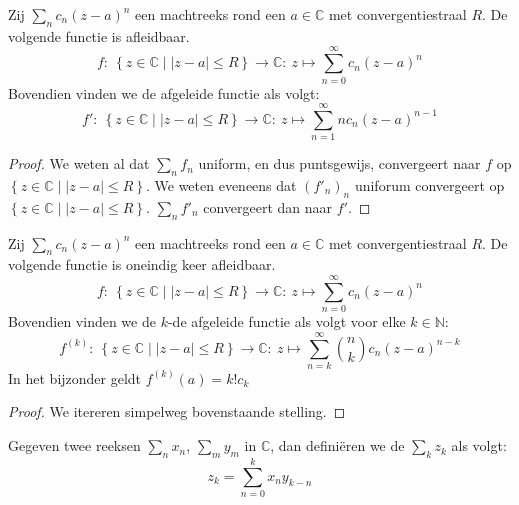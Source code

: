 \documentclass[main.tex]{subfiles}
\begin{document}
\begin{bst}
  Zij $\sum_{n}c_{n}(z-a)^{n}$ een machtreeks rond een $a\in \mathbb{C}$ met convergentiestraal $R$.
  De volgende functie is afleidbaar.
  \[ f:\ \left\{ z \in \mathbb{C} \mid |z-a| \le R \right\} \rightarrow \mathbb{C}:\ z \mapsto \sum_{n=0}^{\infty}c_{n}(z-a)^{n}  \]
  Bovendien vinden we de afgeleide functie als volgt:
  \[ f':\ \left\{ z \in \mathbb{C} \mid |z-a| \le R \right\} \rightarrow \mathbb{C}:\ z \mapsto \sum_{n=1}^{\infty}nc_{n}(z-a)^{n-1}  \]

  \begin{proof}
    We weten al dat $\sum_{n}f_{n}$ uniform, en dus puntsgewijs\needed, convergeert naar $f$ op $\left\{ z \in \mathbb{C} \mid |z-a| \le R \right\}$.
    We weten eveneens dat $(f'_{n})_{n}$ uniforum convergeert op $\left\{ z \in \mathbb{C} \mid |z-a| \le R \right\}$.
    $\sum_{n}f'_{n}$ convergeert dan naar $f'$.
  \end{proof}
\end{bst}

\begin{bgev}
  Zij $\sum_{n}c_{n}(z-a)^{n}$ een machtreeks rond een $a\in \mathbb{C}$ met convergentiestraal $R$.
  De volgende functie is oneindig keer afleidbaar.
  \[ f:\ \left\{ z \in \mathbb{C} \mid |z-a| \le R \right\} \rightarrow \mathbb{C}:\ z \mapsto \sum_{n=0}^{\infty}c_{n}(z-a)^{n}  \]
  Bovendien vinden we de $k$-de afgeleide functie als volgt voor elke $k\in \mathbb{N}$:
  \[ f^{(k)}:\ \left\{ z \in \mathbb{C} \mid |z-a| \le R \right\} \rightarrow \mathbb{C}:\ z \mapsto \sum_{n=k}^{\infty}\binom{n}{k}c_{n}(z-a)^{n-k}  \]
  In het bijzonder geldt $f^{(k)}(a) = k!c_{k}$

  \begin{proof}
    We itereren simpelweg bovenstaande stelling.
  \end{proof}
\end{bgev}

\begin{de}
  Gegeven twee reeksen $\sum_{n}x_{n}$, $\sum_{m}y_{m}$ in $\mathbb{C}$, dan defini\"eren we de  $\sum_{k}z_{k}$ als volgt:
  \[ z_{k} = \sum_{n=0}^{k}x_{n}y_{k-n} \]
\end{de}
\end{document}
